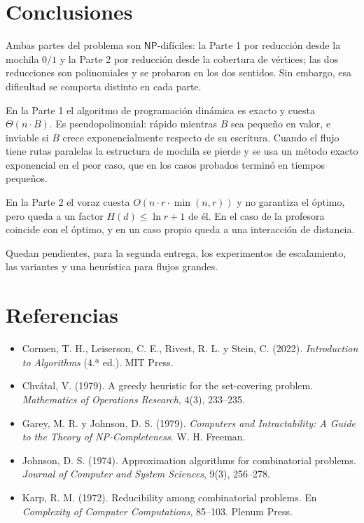 \documentclass[11pt,a4paper]{article}
\theoremstyle{definition}
\newcommand{\NP}{\mathsf{NP}}
\begin{document}
\section{Conclusiones}

Ambas partes del problema son $\NP$-difíciles: la Parte 1 por reducción desde la mochila $0/1$ y la Parte 2 por reducción desde la cobertura de vértices; las dos reducciones son polinomiales y se probaron en los dos sentidos. Sin embargo, esa dificultad se comporta distinto en cada parte.

En la Parte 1 el algoritmo de programación dinámica es exacto y cuesta $\Theta(n\cdot B)$. Es pseudopolinomial: rápido mientras $B$ sea pequeño en valor, e inviable si $B$ crece exponencialmente respecto de su escritura. Cuando el flujo tiene rutas paralelas la estructura de mochila se pierde y se usa un método exacto exponencial en el peor caso, que en los casos probados terminó en tiempos pequeños.

En la Parte 2 el voraz cuesta $O(n\cdot r\cdot\min(n,r))$ y no garantiza el óptimo, pero queda a un factor $H(d)\le\ln r+1$ de él. En el caso de la profesora coincide con el óptimo, y en un caso propio queda a una interacción de distancia.

Quedan pendientes, para la segunda entrega, los experimentos de escalamiento, las variantes y una heurística para flujos grandes.

\section*{Referencias}

\begin{itemize}[leftmargin=1.5em,itemsep=0.3em]
  \item Cormen, T. H., Leiserson, C. E., Rivest, R. L. y Stein, C. (2022). \emph{Introduction to Algorithms} (4.ª ed.). MIT Press.
  \item Chvátal, V. (1979). A greedy heuristic for the set-covering problem. \emph{Mathematics of Operations Research}, 4(3), 233--235.
  \item Garey, M. R. y Johnson, D. S. (1979). \emph{Computers and Intractability: A Guide to the Theory of NP-Completeness}. W. H. Freeman.
  \item Johnson, D. S. (1974). Approximation algorithms for combinatorial problems. \emph{Journal of Computer and System Sciences}, 9(3), 256--278.
  \item Karp, R. M. (1972). Reducibility among combinatorial problems. En \emph{Complexity of Computer Computations}, 85--103. Plenum Press.
\end{itemize}
\end{document}
